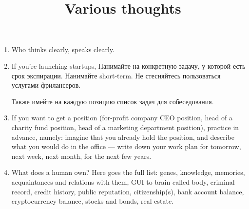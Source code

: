 \documentclass[11pt]{article}
\theoremstyle{remark}
\theoremstyle{definition}
\begin{document}
\baselineskip14pt
\bigskip




\title{Various thoughts}


\maketitle








\begin{enumerate}



\item Who thinks clearly, speaks clearly.

\item If you're launching startups, Нанимайте на конкретную задачу, у которой есть срок экспирации. Нанимайте short-term. Не стесняйтесь пользоваться услугами фрилансеров.

Также имейте на каждую позицию список задач для собеседования.


\item If you want to get a position (for-profit company CEO position, head of a charity fund position, head of a marketing department position), practice in advance, namely: imagine that you already hold the position, and describe what you would do in the office --- write down your work plan for tomorrow, next week, next month, for the next few years.


\item What does a human own? Here goes the full list: genes, knowledge, memories, acquaintances and relations with them, GUI to brain called body, criminal record, credit history, public reputation, citizenship(s), bank account balance, cryptocurrency balance, stocks and bonds, real estate.


\end{enumerate}
\end{document}
